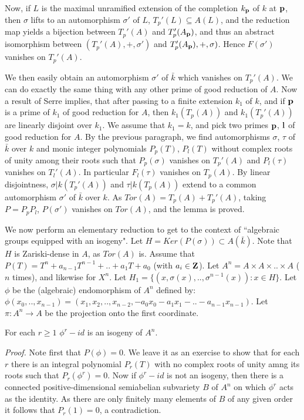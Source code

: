 Now, if $L$ is the maximal unramified extension
of the completion $k_{\bf p}$ of $k$ at ${\bf
p}$, then $\sigma$ lifts to an automorphism
$\sigma'$ of
$L$, $T_{p}'(L)\subseteq A(L)$, and the
reduction map yields a bijection between
$T_{p}'(A)$ and $T_{p}'(A_{\bf p})$, and thus
an abstract isomorphism between
$(T_{p}'(A),+,\sigma')$ and $T_{p}'(A_{\bf
p}),+,\sigma)$. Hence $F(\sigma')$ vanishes on
$T_{p}'(A)$.

We then easily obtain an automorphism
$\sigma'$ of ${\bar k}$ which vanishes on
$T_{p}'(A)$. We can do exactly the same thing
with any other prime of good reduction of $A$.
Now a result of Serre implies, that after
passing to a finite extension $k_{1}$ of $k$,
and if ${\bf p}$ is a prime of $k_{1}$ of good
reduction for $A$, then $k_{1}(T_{p}(A))$ and
$k_{1}(T_{p}'(A))$ are linearly disjoint over
$k_{1}$. We assume that $k_{1} = k$, and pick
two primes ${\bf p}$, ${\bf l}$ of good
reduction for $A$. By the previous paragraph,
we find automorphisms $\sigma$, $\tau$ of
${\bar k}$ over $k$ and monic integer
polynomials
$P_{p}(T)$, $P_{l}(T)$ without complex roots
of unity among their roots such that
$P_{p}(\sigma)$ vanishes on $T_{p}'(A)$ and
$P_{l}(\tau)$ vanishes on $T_{l}'(A)$. In
particular $F_{l}(\tau)$ vanishes on
$T_{p}(A)$. By linear disjointness,
$\sigma|k(T_{p}'(A))$ and $\tau|k(T_{p}(A))$
extend to a common automorphism $\sigma'$ of
${\bar k}$ over $k$. As $Tor(A) = T_{p}(A) +
T_{p}'(A)$, taking $P = P_{p}P_{l}$,
$P(\sigma')$ vanishes on $Tor(A)$, and the
lemma is proved.

\vspace{5mm}
\noindent
We now perform an elementary reduction to get
to the context of ``algebraic groups equipped
with an isogeny". Let
$H = Ker(P(\sigma)) \subset A({\bar k})$. Note
that
$H$ is Zariski-dense in $A$, as $Tor(A)$ is.
Assume that $P(T) = T^{n} + a_{n-1}T^{n-1} +
.. + a_{1}T + a_{0}$ (with $a_{i}\in {\bf
Z}$).  Let $A^{n} = A\times A \times..\times
A$ ($n$ times), and likewise for $X^{n}$. Let
$H_{1} =
\{(x,\sigma(x),..,\sigma^{n-1}(x)):x\in H\}$.
Let $\phi$ be the (algebraic) endomorphism of
$A^{n}$ defined by: $\phi(x_{0},..,x_{n-1}) =
(x_{1},x_{2},..,x_{n-2},-a_{0}x_{0}-a_{1}x_{1}
-..-a_{n-1}x_{n-1})$. Let
$\pi:A^{n}\rightarrow A$ be the projection
onto the first coordinate.

\begin{Remark} For each $r\geq 1$ $\phi^{r} -
id$ is an isogeny of $A^{n}$.
\end{Remark}
{\em Proof.}  Note first that $P(\phi) = 0$.
We leave it as an exercise to show that for
each $r$ there is an integral polynomial
$P_{r}(T)$ with no complex roots of unity amng
its roots such that $P_{r}(\phi^{r}) =0$. Now
if $\phi^{r} - id$ is not an isogeny, then
there is a connected positive-dimensional
semiabelian subvariety $B$ of $A^{n}$ on which
$\phi^{r}$ acts as the identity. As there are
only finitely many elements of $B$ of any given
order it follows that $P_{r}(1) = 0$, a
contradiction.

